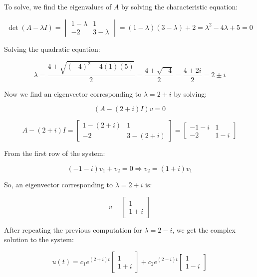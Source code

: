 To solve, we find the eigenvalues of \(A\) by solving the characteristic equation:

\[
    \det(A - \lambda I) =
    \begin{vmatrix}
        1 - \lambda & 1           \\
        -2          & 3 - \lambda
    \end{vmatrix}
    = (1 - \lambda)(3 - \lambda) + 2 = \lambda^2 - 4\lambda + 5 = 0
\]

Solving the quadratic equation:

\[
    \lambda = \frac{4 \pm \sqrt{(-4)^2 - 4(1)(5)}}{2} = \frac{4 \pm \sqrt{-4}}{2} = \frac{4 \pm 2i}{2}
    = 2 \pm i
\]

Now we find an eigenvector corresponding to \( \lambda = 2 + i \) by solving:

\[
    (A - (2 + i)I)v = 0
\]

\[
    A - (2 + i)I = \begin{bmatrix} 1 - (2 + i) & 1 \\ -2 & 3 - (2 + i) \end{bmatrix}
    = \begin{bmatrix} -1 - i & 1 \\ -2 & 1 - i \end{bmatrix}
\]

From the first row of the system:

\[
    (-1 - i)v_1 + v_2 = 0 \Rightarrow v_2 = (1 + i)v_1
\]

So, an eigenvector corresponding to \( \lambda = 2 + i \) is:

\[
    v = \begin{bmatrix} 1 \\ 1 + i \end{bmatrix}
\]

After repeating the previous computation for \(\lambda = 2 - i\), we get the complex solution to the
system:

\[
    u(t) = c_1 e^{(2 + i)t} \begin{bmatrix} 1 \\ 1 + i \end{bmatrix}
    + c_2 e^{(2 - i)t} \begin{bmatrix} 1 \\ 1 - i \end{bmatrix}
\]

